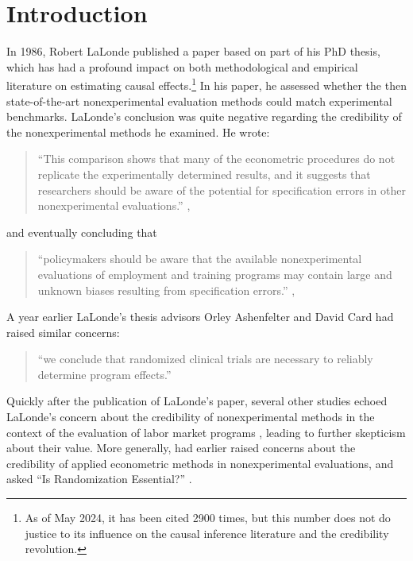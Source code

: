 \documentclass[letterpaper,12pt,leqno]{article}
\begin{document}


\clearpage


\section{Introduction}\label{s:introduction}

In 1986, Robert LaLonde published a paper \citep{LaLonde} based on part of his PhD thesis, which has had a profound impact on both methodological and empirical literature on estimating causal effects.\footnote{As of May 2024, it has been cited 2900 times, but this number does not do justice to its influence on the causal inference literature and the credibility revolution.}
In his paper, he assessed whether the then state-of-the-art nonexperimental evaluation methods could match experimental benchmarks. LaLonde's conclusion was quite negative regarding the credibility of the nonexperimental methods he examined. He wrote:
\begin{quote}
``This comparison shows that many of the econometric procedures do not replicate the experimentally determined results, and it suggests that researchers should be aware of the potential for specification errors in other nonexperimental evaluations.'' \cite[Abstract, p. 604]{LaLonde},
\end{quote}
and eventually concluding that
\begin{quote}
``policymakers should be aware that the available nonexperimental evaluations of employment and training programs may contain large and unknown biases resulting from specification errors.'' \cite[Conclusion, p. 617]{LaLonde},
\end{quote}
A year earlier LaLonde's thesis advisors Orley Ashenfelter and David Card had raised similar concerns:
\begin{quote}
``we conclude that randomized clinical trials are
necessary to reliably determine program effects.''   \cite[Abstract, p. 648]{ashenfelter1985using}
\end{quote}
Quickly after the publication of LaLonde's paper, several other studies echoed LaLonde's concern about the credibility of nonexperimental methods in the context of the evaluation of labor market programs \citep{fraker1987adequacy, heckman1987we}, leading to further skepticism about their value. More generally, \citet{leamer1983let} had earlier raised concerns about the credibility of applied econometric methods in nonexperimental evaluations, and asked ``Is Randomization Essential?'' \cite[p. 31]{leamer1983let}. 
\end{document}

